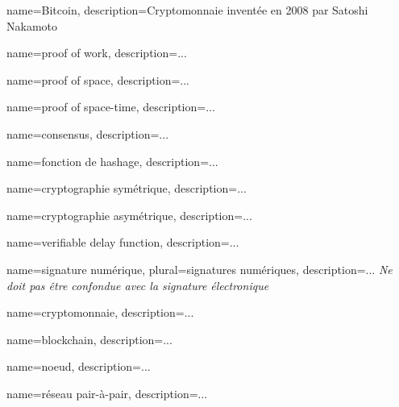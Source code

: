 {
    name=Bitcoin,
    description={Cryptomonnaie inventée en 2008 par Satoshi Nakamoto}
}

{
    name=proof of work,
    description={...}
}

{
    name=proof of space,
    description={...}
}

{
    name=proof of space-time,
    description={...}
}

{
    name=consensus,
    description={...}
}

{
    name=fonction de hashage,
    description={...}
}

{
    name=cryptographie symétrique,
    description={...}
}

{
    name=cryptographie asymétrique,
    description={...}
}

{
    name=verifiable delay function,
    description={...}
}

{
    name=signature numérique,
    plural=signatures numériques,
    description={... \textit{Ne doit pas être confondue avec la signature électronique}}
}

{
    name=cryptomonnaie,
    description={...}
}

{
    name=blockchain,
    description={...}
}

{
    name=noeud,
    description={...}
}

{
    name=réseau pair-à-pair,
    description={...}
}